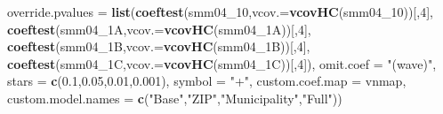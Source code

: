 \documentclass[
]{article}
\newenvironment{Shaded}{\begin{snugshade}}{\end{snugshade}}
\newcommand{\DataTypeTok}[1]{\textcolor[rgb]{0.13,0.29,0.53}{#1}}
\newcommand{\DecValTok}[1]{\textcolor[rgb]{0.00,0.00,0.81}{#1}}
\newcommand{\FloatTok}[1]{\textcolor[rgb]{0.00,0.00,0.81}{#1}}
\newcommand{\KeywordTok}[1]{\textcolor[rgb]{0.13,0.29,0.53}{\textbf{#1}}}
\newcommand{\NormalTok}[1]{#1}
\newcommand{\StringTok}[1]{\textcolor[rgb]{0.31,0.60,0.02}{#1}}
\begin{document}
\begin{Shaded}
\begin{Highlighting}[]
          \DataTypeTok{override.pvalues =} \KeywordTok{list}\NormalTok{(}\KeywordTok{coeftest}\NormalTok{(smm04_}\DecValTok{10}\NormalTok{,}\DataTypeTok{vcov.=}\KeywordTok{vcovHC}\NormalTok{(smm04_}\DecValTok{10}\NormalTok{))[,}\DecValTok{4}\NormalTok{],}
                                  \KeywordTok{coeftest}\NormalTok{(smm04_1A,}\DataTypeTok{vcov.=}\KeywordTok{vcovHC}\NormalTok{(smm04_1A))[,}\DecValTok{4}\NormalTok{],}
                                  \KeywordTok{coeftest}\NormalTok{(smm04_1B,}\DataTypeTok{vcov.=}\KeywordTok{vcovHC}\NormalTok{(smm04_1B))[,}\DecValTok{4}\NormalTok{],}
                                  \KeywordTok{coeftest}\NormalTok{(smm04_1C,}\DataTypeTok{vcov.=}\KeywordTok{vcovHC}\NormalTok{(smm04_1C))[,}\DecValTok{4}\NormalTok{]),}
          \DataTypeTok{omit.coef =} \StringTok{"(wave)"}\NormalTok{, }\DataTypeTok{stars =} \KeywordTok{c}\NormalTok{(}\FloatTok{0.1}\NormalTok{,}\FloatTok{0.05}\NormalTok{,}\FloatTok{0.01}\NormalTok{,}\FloatTok{0.001}\NormalTok{), }\DataTypeTok{symbol =} \StringTok{"+"}\NormalTok{,}
          \DataTypeTok{custom.coef.map =}\NormalTok{ vnmap, }
          \DataTypeTok{custom.model.names =} \KeywordTok{c}\NormalTok{(}\StringTok{"Base"}\NormalTok{,}\StringTok{"ZIP"}\NormalTok{,}\StringTok{"Municipality"}\NormalTok{,}\StringTok{"Full"}\NormalTok{))}
\end{Highlighting}
\end{Shaded}
\end{document}
